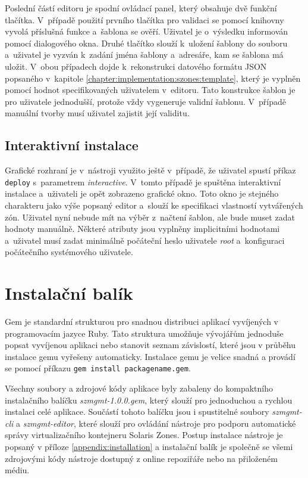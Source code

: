 Poslední částí editoru je spodní ovládací panel, který obsahuje dvě funkční tlačítka. V~případě použití prvního tlačítka
pro validaci se pomocí knihovny vyvolá příslušná funkce a~šablona se ověří. Uživatel je o~výsledku informován pomocí dialogového
okna. Druhé tlačítko slouží k~uložení šablony do souboru a~uživatel je vyzván k~zadání jména šablony a~adresáře, kam se šablona má uložit.
V~obou případech dojde k~rekonstrukci datového formátu JSON popsaného v~kapitole \ref{chapter:implementation:szones:template},
který je vyplněn pomocí hodnot specifikovaných uživatelem v~editoru. Tato konstrukce šablon je pro uživatele jednodušší, protože
vždy vygeneruje validní šablonu. V~případě manuální tvorby musí uživatel zajistit její validitu.
\subsection{Interaktivní instalace}
\label{chapter:implementation:gui:interactive}
Grafické rozhraní je v~nástroji využito ještě v~případě, že uživatel spustí příkaz \verb|deploy| s~parametrem \textit{interactive}.
V~tomto případě je spuštěna interaktivní instalace a~uživateli je opět zobrazeno grafické okno. Toto okno je stejného charakteru
jako výše popsaný editor a~slouží ke specifikaci vlastností vytvářených zón. Uživatel nyní nebude mít na výběr z~načtení šablon, ale bude muset
zadat hodnoty manuálně. Některé atributy jsou vyplněny implicitními hodnotami a~uživatel musí zadat minimálně počáteční heslo 
uživatele \textit{root} a~konfiguraci počátečního systémového uživatele.
\section{Instalační balík}
\label{chapter:implementation:package}
Gem je standardní strukturou pro snadnou distribuci aplikací vyvíjených v programovacím jazyce Ruby. Tato struktura umožňuje vývojářům
jednoduše popsat vyvíjenou aplikaci nebo stanovit seznam závislostí, které jsou v průběhu instalace gemu vyřešeny automaticky.
Instalace gemu je velice snadná a provádí se pomocí příkazu \texttt{gem install packagename.gem}.

Všechny soubory a zdrojové kódy aplikace byly zabaleny do kompaktního instalačního balíčku \textit{szmgmt-1.0.0.gem}, který
slouží pro jednoduchou a rychlou instalaci celé aplikace.  Součástí tohoto balíčku jsou i spustitelné soubory \textit{szmgmt-cli} a
\textit{szmgmt-editor}, které slouží pro ovládání nástroje pro podporu automatické správy virtualizačního kontejneru Solaris Zones.
Postup instalace nástroje je popsaný v příloze \ref{appendix:installation} a instalační balík je společně se všemi zdrojovými kódy
nástroje dostupný z online repoziřáře \cite{tool:repository} nebo na přiloženém médiu.